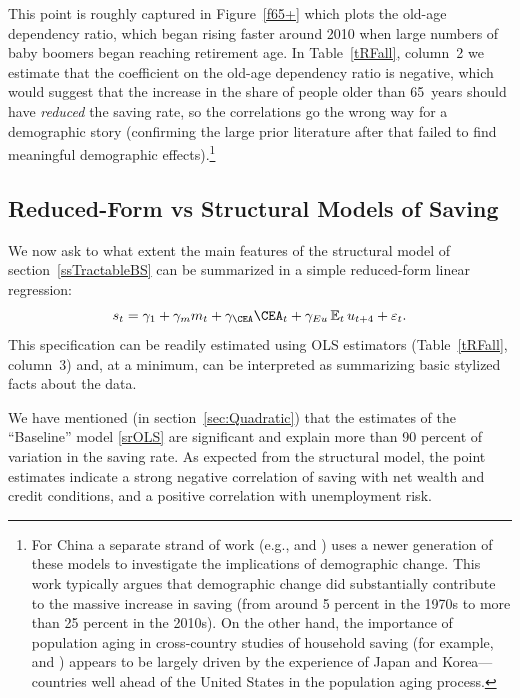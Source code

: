 \documentclass[titlepage]{\econtex}
\begin{document}
\hypertarget{Kotlikoff}{}
This point is roughly captured in Figure~\ref{f65+} which plots the old-age dependency ratio, which began rising faster around 2010 when large numbers of baby boomers began reaching retirement age.
In Table~\ref{tRFall}, column~2 we estimate that the coefficient on the old-age dependency ratio is negative, which would suggest that the increase in the share of people older than 65~years should have \emph{reduced} the saving rate, so the correlations go the wrong way for a demographic story (confirming the large prior literature after \cite{auerbachKotlikoffDemographicsAndSaving} that failed to find meaningful demographic effects).\footnote{For China a separate strand of work (e.g., \cite{curtisEtAl} and \cite{imrohroglu_China}) uses a newer generation of these models to investigate the implications of demographic change.  This work typically argues that demographic change did substantially contribute to the massive increase in saving (from around 5 percent in the 1970s to more than 25 percent in the 2010s).  On the other hand, the importance of population aging in cross-country studies of household saving (for example, \cite{bloomEtAl_JME07} and \cite{bosworthChodorowReich07}) appears to be largely driven by the experience of Japan and Korea---countries well ahead of the United States in the population aging process.
}

\hypertarget{Reduced-Form-vs-Structural-Models-of-Saving}{}

\subsection{Reduced-Form vs Structural Models of Saving}

We now ask to what extent the main features of the structural model of section~\ref{ssTractableBS} can be summarized in a simple reduced-form linear regression:
\begin{equation}
s_t=\gamma_1+\gamma_m m_t +\gamma_{\CEA}\CEA_t+\gamma_{Eu}\Ex_t u_{t+4}+\varepsilon_t. \label{srOLS}
\end{equation}
This specification can be readily estimated using OLS estimators (Table~\ref{tRFall}, column~3) and, at a minimum, can be interpreted as summarizing basic
stylized facts about the data.

We have mentioned (in section~\ref{sec:Quadratic}) that the estimates of the ``Baseline'' model \eqref{srOLS} are significant and explain more than 90 percent of variation in the saving rate. As expected from the structural model, the point estimates indicate a strong negative correlation of saving with net wealth and credit conditions, and a positive correlation with unemployment risk.
\end{document}
